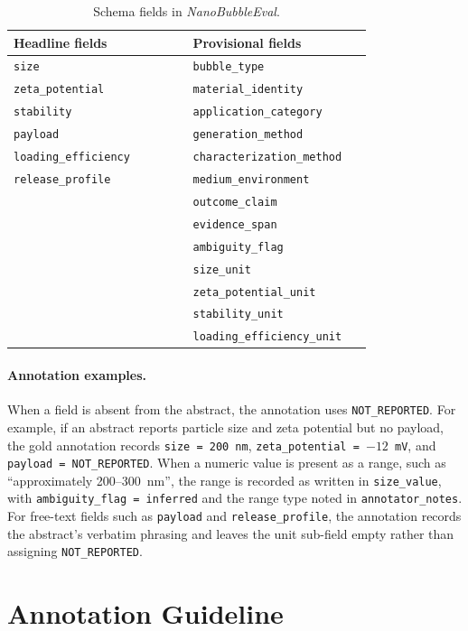 \documentclass{article}
\newcommand{\NR}{\texttt{NOT\_REPORTED}}
\begin{document}
\begin{table}[h]
\centering
\caption{Schema fields in \textit{NanoBubbleEval}.}
\label{tab:app_schema_fields}
\small
\setlength{\tabcolsep}{6pt}
\begin{tabular}{@{}p{0.45\linewidth}p{0.45\linewidth}@{}}
\toprule
\textbf{Headline fields} & \textbf{Provisional fields} \\
\midrule
\texttt{size} & \texttt{bubble\_type} \\
\texttt{zeta\_potential} & \texttt{material\_identity} \\
\texttt{stability} & \texttt{application\_category} \\
\texttt{payload} & \texttt{generation\_method} \\
\texttt{loading\_efficiency} & \texttt{characterization\_method} \\
\texttt{release\_profile} & \texttt{medium\_environment} \\
 & \texttt{outcome\_claim} \\
 & \texttt{evidence\_span} \\
 & \texttt{ambiguity\_flag} \\
 & \texttt{size\_unit} \\
 & \texttt{zeta\_potential\_unit} \\
 & \texttt{stability\_unit} \\
 & \texttt{loading\_efficiency\_unit} \\
\bottomrule
\end{tabular}
\end{table}

\paragraph{Annotation examples.}
When a field is absent from the abstract, the annotation uses \NR{}.
For example, if an abstract reports particle size and zeta potential
but no payload, the gold annotation records \texttt{size = 200~nm},
\texttt{zeta\_potential = $-12$~mV}, and \texttt{payload = \NR{}}.
When a numeric value is present as a range, such as
``approximately 200--300~nm'', the range is recorded as written in
\texttt{size\_value}, with \texttt{ambiguity\_flag = inferred} and
the range type noted in \texttt{annotator\_notes}. For free-text
fields such as \texttt{payload} and \texttt{release\_profile}, the
annotation records the abstract's verbatim phrasing and leaves the
unit sub-field empty rather than assigning \NR{}.


\section{Annotation Guideline}
\label{app:guideline}
\end{document}
